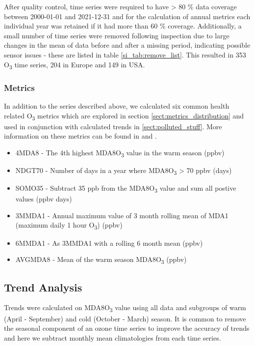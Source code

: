\documentclass[journal abbreviation, manuscript]{copernicus}
\begin{document}
After quality control, time series were required to have > 80 \% data coverage between 2000-01-01 and 2021-12-31 and for the calculation of annual metrics each individual year was retained if it had more than 60 \% coverage. Additionally, a small number of time series were removed following inspection due to large changes in the mean of data before and after a missing period, indicating possible sensor issues - these are listed in table \ref{si_tab:remove_list}. This resulted in 353 O\textsubscript{3} time series, 204 in Europe and 149 in USA. 

\subsubsection{Metrics}

In addition to the series described above, we calculated six common health related O\textsubscript{3} metrics which are explored in section \ref{sect:metrics_distribution} and used in conjunction with calculated trends in \ref{sect:polluted_stuff}. More information on these metrics can be found in \cite{10.1525/elementa.279} and \cite{fleming_2018}.

\begin{itemize}
    \item 4MDA8 - The 4th highest MDA8O\textsubscript{3} value in the warm season (ppbv)
    \item NDGT70 - Number of days in a year where MDA8O\textsubscript{3} > 70 ppbv (days)
    \item SOMO35 - Subtract 35 ppb from the MDA8O\textsubscript{3} value and sum all postive values (ppbv days)
    \item 3MMDA1 - Annual maximum value of 3 month rolling mean of MDA1 (maximum daily 1 hour O\textsubscript{3}) (ppbv)
    \item 6MMDA1 - As 3MMDA1 with a rolling 6 month mean (ppbv)
    \item AVGMDA8 - Mean of the warm season MDA8O\textsubscript{3} (ppbv)
\end{itemize}

\subsection{Trend Analysis}

Trends were calculated on MDA8O\textsubscript{3} value using all data and subgroups of warm (April - September) and cold (October - March) season. It is common to remove the seasonal component of an ozone time series to improve the accuracy of trends \citep{cooper_2020} and here we subtract monthly mean climatologies from each time series. 
\end{document}
